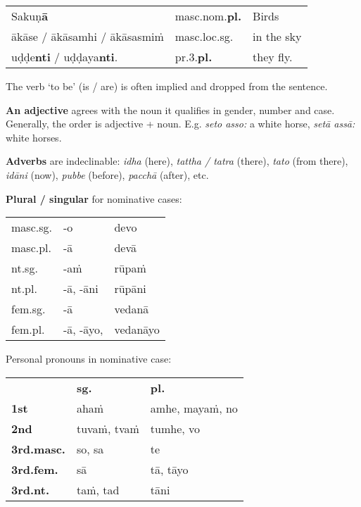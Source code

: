 \documentclass[11pt,oneside]{memoir}
\begin{document}
\begin{center}
\begin{tabular}{lll}
Sakuṇ\textbf{ā} & masc.nom.\textbf{pl.} & Birds\\[0pt]
ākāse / ākāsamhi / ākāsasmiṁ & masc.loc.sg. & in the sky\\[0pt]
uḍḍe\textbf{nti} / uḍḍaya\textbf{nti}. & pr.3.\textbf{pl.} & they fly.\\[0pt]
\end{tabular}
\end{center}

The verb `to be' (is / are) is often implied and dropped from the sentence.

\textbf{An adjective} agrees with the noun it qualifies in gender, number and case. \\[0pt]
Generally, the order is adjective + noun. E.g. \emph{seto asso:} a white horse, \emph{setā assā:} white horses.

\textbf{Adverbs} are indeclinable: \emph{idha} (here), \emph{tattha / tatra} (there), \emph{tato}
(from there), \emph{idāni} (now), \emph{pubbe} (before), \emph{pacchā} (after), etc.

\bigskip

\begin{multicols}{2}

\textbf{Plural / singular} for nominative cases:

\begin{center}
\begin{tabular}{lll}
masc.sg. & -o & devo\\[0pt]
masc.pl. & -ā & devā\\[0pt]
\hline
nt.sg. & -aṁ & rūpaṁ\\[0pt]
nt.pl. & -ā, -āni & rūpāni\\[0pt]
\hline
fem.sg. & -ā & vedanā\\[0pt]
fem.pl. & -ā, -āyo, & vedanāyo\\[0pt]
\end{tabular}
\end{center}

\columnbreak

Personal pronouns in nominative case:

\begin{center}
\begin{tabular}{lll}
 & \textbf{sg.} & \textbf{pl.}\\[0pt]
\textbf{1st} & ahaṁ & amhe, mayaṁ, no\\[0pt]
\textbf{2nd} & tuvaṁ, tvaṁ & tumhe, vo\\[0pt]
\textbf{3rd.masc.} & so, sa & te\\[0pt]
\textbf{3rd.fem.} & sā & tā, tāyo\\[0pt]
\textbf{3rd.nt.} & taṁ, tad & tāni\\[0pt]
\end{tabular}
\end{center}

\end{multicols}
\bigskip
\end{document}
